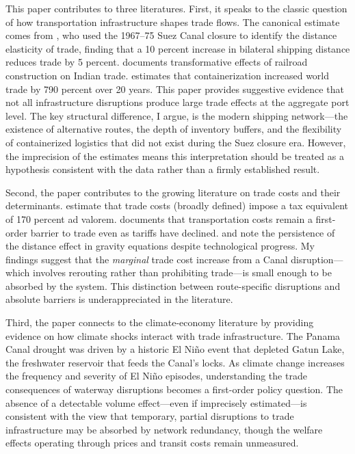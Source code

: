 \documentclass[12pt]{article}
\begin{document}
This paper contributes to three literatures. First, it speaks to the classic question of how transportation infrastructure shapes trade flows. The canonical estimate comes from \citet{feyrer2021distance}, who used the 1967--75 Suez Canal closure to identify the distance elasticity of trade, finding that a 10 percent increase in bilateral shipping distance reduces trade by 5 percent. \citet{donaldson2018railroads} documents transformative effects of railroad construction on Indian trade. \citet{bernhofen2016estimating} estimates that containerization increased world trade by 790 percent over 20 years. This paper provides suggestive evidence that not all infrastructure disruptions produce large trade effects at the aggregate port level. The key structural difference, I argue, is the modern shipping network---the existence of alternative routes, the depth of inventory buffers, and the flexibility of containerized logistics that did not exist during the Suez closure era. However, the imprecision of the estimates means this interpretation should be treated as a hypothesis consistent with the data rather than a firmly established result.

Second, the paper contributes to the growing literature on trade costs and their determinants. \citet{anderson2004trade} estimate that trade costs (broadly defined) impose a tax equivalent of 170 percent ad valorem. \citet{hummels2007transportation} documents that transportation costs remain a first-order barrier to trade even as tariffs have declined. \citet{head2014gravity} and \citet{disdier2008puzzling} note the persistence of the distance effect in gravity equations despite technological progress. My findings suggest that the \textit{marginal} trade cost increase from a Canal disruption---which involves rerouting rather than prohibiting trade---is small enough to be absorbed by the system. This distinction between route-specific disruptions and absolute barriers is underappreciated in the literature.

Third, the paper connects to the climate-economy literature \citep{dell2014we, hsiang2016climate, burke2015global, desmet2021evaluating} by providing evidence on how climate shocks interact with trade infrastructure. The Panama Canal drought was driven by a historic El Ni\~{n}o event that depleted Gatun Lake, the freshwater reservoir that feeds the Canal's locks. As climate change increases the frequency and severity of El Ni\~{n}o episodes, understanding the trade consequences of waterway disruptions becomes a first-order policy question. The absence of a detectable volume effect---even if imprecisely estimated---is consistent with the view that temporary, partial disruptions to trade infrastructure may be absorbed by network redundancy, though the welfare effects operating through prices and transit costs remain unmeasured.
\end{document}
